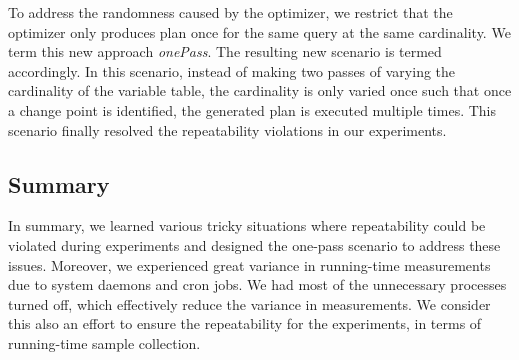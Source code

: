 To address the randomness caused by the optimizer, we restrict that
the optimizer only produces plan once for the same query at the same
cardinality. We term this new approach {\em onePass}. The resulting
new scenario is termed accordingly. In this scenario, instead of making
two passes of varying the cardinality of the variable table, the cardinality
is only varied once such that once a change point is identified, the generated
plan is executed multiple times. This scenario finally resolved the
repeatability violations in our experiments.



\subsection{Summary}
In summary, we learned various tricky situations where repeatability
could be violated during experiments and designed the one-pass scenario
to address these issues. Moreover, we experienced great variance in
running-time measurements due to system daemons and cron jobs. We had most
of the unnecessary processes turned off, which effectively reduce the
variance in measurements. We consider this also an effort to ensure the
repeatability for the experiments, in terms of running-time sample collection.

